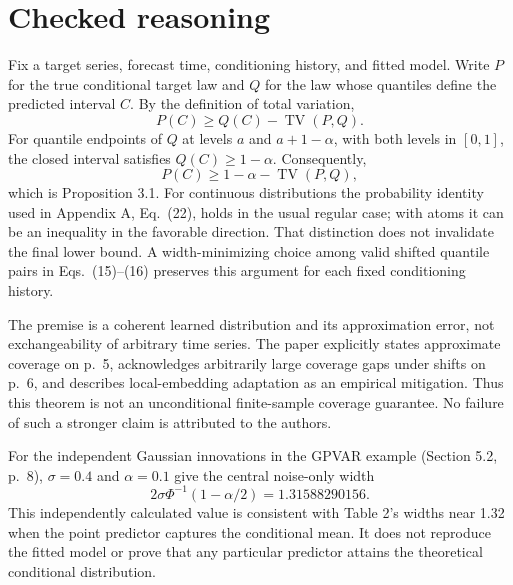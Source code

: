 \documentclass[10pt]{article}
\begin{document}
\section*{Checked reasoning}
Fix a target series, forecast time, conditioning history, and fitted model. Write \(P\) for the true conditional target law and \(Q\) for the law whose quantiles define the predicted interval \(C\). By the definition of total variation, \[P(C)\geq Q(C)-\operatorname{TV}(P,Q).\] For quantile endpoints of \(Q\) at levels \(a\) and \(a+1-\alpha\), with both levels in \([0,1]\), the closed interval satisfies \(Q(C)\geq1-\alpha\). Consequently, \[P(C)\geq1-\alpha-\operatorname{TV}(P,Q),\] which is Proposition 3.1. For continuous distributions the probability identity used in Appendix A, Eq. (22), holds in the usual regular case; with atoms it can be an inequality in the favorable direction. That distinction does not invalidate the final lower bound. A width-minimizing choice among valid shifted quantile pairs in Eqs. (15)–(16) preserves this argument for each fixed conditioning history.\par
The premise is a coherent learned distribution and its approximation error, not exchangeability of arbitrary time series. The paper explicitly states approximate coverage on p. 5, acknowledges arbitrarily large coverage gaps under shifts on p. 6, and describes local-embedding adaptation as an empirical mitigation. Thus this theorem is not an unconditional finite-sample coverage guarantee. No failure of such a stronger claim is attributed to the authors.\par
For the independent Gaussian innovations in the GPVAR example (Section 5.2, p. 8), \(\sigma=0.4\) and \(\alpha=0.1\) give the central noise-only width \[2\sigma\Phi^{-1}(1-\alpha/2)=1.31588290156.\] This independently calculated value is consistent with Table 2’s widths near 1.32 when the point predictor captures the conditional mean. It does not reproduce the fitted model or prove that any particular predictor attains the theoretical conditional distribution.\par
\end{document}
